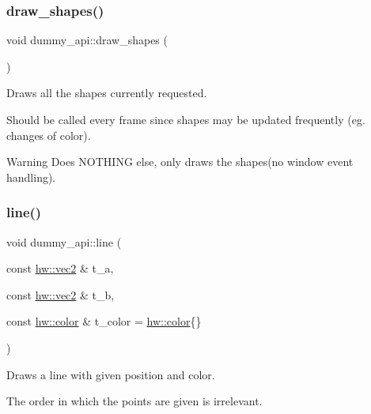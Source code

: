 \subsubsection{\texorpdfstring{draw\+\_\+shapes()}{draw\_shapes()}}
{\footnotesize\ttfamily void dummy\+\_\+api\+::draw\+\_\+shapes (\begin{DoxyParamCaption}{ }\end{DoxyParamCaption})}



Draws all the shapes currently requested. 

Should be called every frame since shapes may be updated frequently (eg. changes of color).

\begin{DoxyWarning}{Warning}
Does N\+O\+T\+H\+I\+NG else, only draws the shapes(no window event handling). 
\end{DoxyWarning}
\mbox{\label{namespacedummy__api_a7bac2a56021c552911f6dc5ae4c8f5ad}} 
\subsubsection{\texorpdfstring{line()}{line()}\hspace{0.1cm}{\footnotesize\ttfamily [1/2]}}
{\footnotesize\ttfamily void dummy\+\_\+api\+::line (\begin{DoxyParamCaption}\item[{const \mbox{\hyperlink{structhw_1_1vec2}{hw\+::vec2}} \&}]{t\+\_\+a,  }\item[{const \mbox{\hyperlink{structhw_1_1vec2}{hw\+::vec2}} \&}]{t\+\_\+b,  }\item[{const \mbox{\hyperlink{structhw_1_1color}{hw\+::color}} \&}]{t\+\_\+color = {\ttfamily \mbox{\hyperlink{structhw_1_1color}{hw\+::color}}\{\}} }\end{DoxyParamCaption})}



Draws a line with given position and color. 

The order in which the points are given is irrelevant. \mbox{\label{namespacedummy__api_afc5312dbe53632c5a898028246252a13}} 
